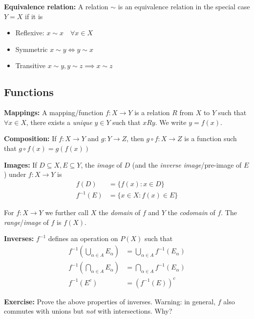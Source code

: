 \documentclass[12pt]{article}
\newcommand{\sub}{\subseteq}
\newenvironment*{exercise}[1][red]{
    \begin{tcolorbox}[
        parbox=false,
        colback=#1!5!white,
        colframe=#1!75!black,
        breakable
    ]}
    {\end{tcolorbox}}
\begin{document}
    \textbf{Equivalence relation:} A relation $\sim$ is an equivalence relation in the special case $Y = X$ if it is
    \begin{itemize}
        \item Reflexive: $x\sim x \quad \forall x \in X$
        \item Symmetric $x\sim y \iff y\sim x$
        \item Transitive $x\sim y, y\sim z \implies x\sim z$
    \end{itemize}

    \subsection*{Functions}
    \textbf{Mappings:} A mapping/function $f: X \to Y$ is a relation $R$ from $X$ to $Y$ such that $\forall x \in X$, there exists a \emph{unique} $y \in Y$ such that $xRy$. We write $y = f(x)$.

    \textbf{Composition:} If $f: X \to Y$ and $g: Y \to Z$, then $g \circ f: X \to Z$ is a function such that $g \circ f(x) = g(f(x))$

    \textbf{Images:} If $D \sub X, E \sub Y$, the \emph{image} of $D$ (and the \emph{inverse image}/pre-image of $E$) under $f: X \to Y$ is
    \begin{align*}
        f(D) &= \{f(x) : x \in D\}\\ 
        f^{-1}(E) &= \{x \in X : f(x) \in E\}
    \end{align*}

    For $f: X \to Y$ we further call $X$ the \emph{domain} of $f$ and $Y$ the \emph{codomain} of $f$. The \emph{range}/\emph{image} of $f$ is $f(X)$.

    \textbf{Inverses:} $f^{-1}$ defines an operation on $P(X)$ such that
    \begin{align*}
        f^{-1}\left(\bigcup_{\alpha \in A} E_{\alpha}\right) &= \bigcup_{\alpha \in A} f^{-1}(E_{\alpha})\\
        f^{-1}\left(\bigcap_{\alpha \in A} E_{\alpha}\right) &= \bigcap_{\alpha \in A} f^{-1}(E_{\alpha})\\ 
        f^{-1}(E^c) &= (f^{-1}(E))^c
    \end{align*}
    
    \begin{exercise}
        \textbf{Exercise:} Prove the above properties of inverses. Warning: in general, $f$ also commutes with unions but \emph{not} with intersections. Why?
    \end{exercise}
\end{document}
